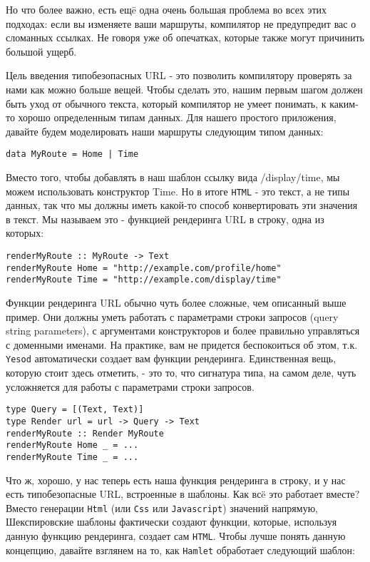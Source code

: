 Но что более важно, есть ещë одна очень большая проблема во всех этих подходах:
если вы изменяете ваши маршруты, компилятор не предупредит вас о сломанных
ссылках. Не говоря уже об опечатках, которые также могут причинить большой ущерб.

Цель введения типобезопасных URL - это позволить компилятору проверять за
нами как можно больше вещей. Чтобы сделать это, нашим первым шагом
должен быть уход от обычного текста, который компилятор не умеет понимать,
к каким-то хорошо определенным типам данных. Для нашего простого приложения,
давайте будем моделировать наши маршруты следующим типом данных:

\begin{lstlisting}
data MyRoute = Home | Time
\end{lstlisting}

Вместо того, чтобы добавлять в наш шаблон ссылку вида /display/time, мы можем
использовать конструктор Time. Но в итоге \texttt{HTML} - это текст, а не типы данных,
так что мы должны иметь какой-то способ конвертировать эти значения в текст.
Мы называем это - функцией рендеринга URL в строку, одна из которых:

\begin{lstlisting}
renderMyRoute :: MyRoute -> Text
renderMyRoute Home = "http://example.com/profile/home"
renderMyRoute Time = "http://example.com/display/time"
\end{lstlisting}

\begin{remark}
Функции рендеринга URL обычно чуть более сложные, чем описанный выше пример.
Они должны уметь работать с параметрами строки запросов (query string parameters),
с аргументами конструкторов и более правильно управляться с доменными именами.
На практике, вам не придется беспокоиться об этом, т.к. \texttt{Yesod} автоматически
создает вам функции рендеринга. Единственная вещь, которую стоит здесь отметить,
 - это то, что сигнатура типа, на самом деле, чуть усложняется для
работы с параметрами строки запросов.

\begin{lstlisting}
type Query = [(Text, Text)]
type Render url = url -> Query -> Text
renderMyRoute :: Render MyRoute
renderMyRoute Home _ = ...
renderMyRoute Time _ = ...
\end{lstlisting}
\end{remark}

Что ж, хорошо, у нас теперь есть наша функция рендеринга в строку, и у нас есть
типобезопасные URL, встроенные в шаблоны. Как всë это работает вместе?
Вместо генерации \lstinline!Html! (или \lstinline!Css! или \lstinline!Javascript!) значений напрямую,
Шекспировские шаблоны фактически создают функции, которые, используя данную
функцию рендеринга, создает сам \texttt{HTML}. Чтобы лучше понять данную концепцию,
давайте взглянем на то, как \texttt{Hamlet} обработает следующий шаблон:

